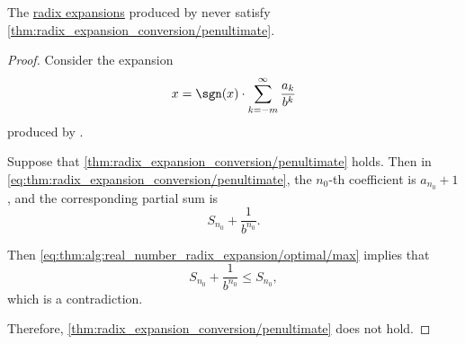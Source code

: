 \begin{lemma}\label{thm:real_number_radix_expansion_zeros}
  The \hyperref[def:real_number_radix_expansion]{radix expansions} produced by  never satisfy \cref{thm:radix_expansion_conversion/penultimate}.
\end{lemma}
\begin{proof}
  Consider the expansion
  \begin{equation*}
    x = \sgn(x) \cdot \sum_{k=-m}^\infty \frac {a_k} {b^k}
  \end{equation*}
  produced by .

  Suppose that \cref{thm:radix_expansion_conversion/penultimate} holds. Then  in \eqref{eq:thm:radix_expansion_conversion/penultimate}, the \( n_0 \)-th coefficient is \( a_{n_0} + 1 \), and the corresponding partial sum is
  \begin{equation*}
    S_{n_0} + \frac 1 {b^{n_0}}.
  \end{equation*}

  Then \eqref{eq:thm:alg:real_number_radix_expansion/optimal/max} implies that
  \begin{equation*}
    S_{n_0} + \frac 1 {b^{n_0}} \leq S_{n_0},
  \end{equation*}
  which is a contradiction.

  Therefore, \cref{thm:radix_expansion_conversion/penultimate} does not hold.
\end{proof}

